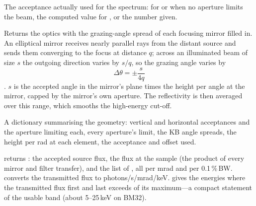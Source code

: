 The acceptance actually used for the spectrum:  for  or when no aperture
limits the beam, the computed value for , or the number given.

Returns the optics with the grazing-angle spread of each focusing mirror filled in. An
elliptical mirror receives nearly parallel rays from the distant source and sends them
converging to the focus at distance $q$; across an illuminated beam of size $s$ the outgoing
direction varies by $s/q$, so the grazing angle varies by
\begin{equation}
  \Delta\theta = \pm\frac{s}{4q}
\end{equation}
\citep{Kirkpatrick1948}. $s$ is the accepted angle in the mirror's plane times the height per
angle at the mirror, capped by the mirror's own aperture. The reflectivity is then averaged
over this range, which smooths the high-energy cut-off.

A dictionary summarising the geometry: vertical and horizontal acceptances and the aperture
limiting each, every aperture's limit, the KB angle spreads, the height per \textmu rad at
each element, the acceptance and offset used.

 returns : the accepted source flux, the flux at
the sample (the product of every mirror and filter transfer), and the list of
, all per mrad and per 0.1\,\%\,BW.  converts the
transmitted flux to photons/s/mrad/keV.  gives the energies where the
transmitted flux first and last exceeds  of its maximum---a compact statement of the
usable band (about 5--25\,keV on BM32).


